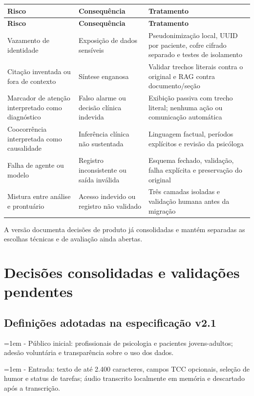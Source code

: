 \documentclass[11pt,a4paper]{article}
\begin{document}
\begingroup\small
\begin{longtable}{>{\raggedright\arraybackslash}p{}>{\raggedright\arraybackslash}p{}>{\raggedright\arraybackslash}p{}}
\toprule
\textbf{Risco} & \textbf{Consequência} & \textbf{Tratamento} \\ \midrule\endfirsthead
\toprule
\textbf{Risco} & \textbf{Consequência} & \textbf{Tratamento} \\ \midrule\endhead
\bottomrule\endfoot
Vazamento de identidade & Exposição de dados sensíveis & Pseudonimização local, UUID por paciente, cofre cifrado separado e testes de isolamento \\[3pt]
Citação inventada ou fora de contexto & Síntese enganosa & Validar trechos literais contra o original e RAG contra documento/seção \\[3pt]
Marcador de atenção interpretado como diagnóstico & Falso alarme ou decisão clínica indevida & Exibição passiva com trecho literal; nenhuma ação ou comunicação automática \\[3pt]
Coocorrência interpretada como causalidade & Inferência clínica não sustentada & Linguagem factual, períodos explícitos e revisão da psicóloga \\[3pt]
Falha de agente ou modelo & Registro inconsistente ou saída inválida & Esquema fechado, validação, falha explícita e preservação do original \\[3pt]
Mistura entre análise e prontuário & Acesso indevido ou registro não validado & Três camadas isoladas e validação humana antes da migração \\[3pt]
\end{longtable}
\endgroup
A versão documenta decisões de produto já consolidadas e mantém separadas as escolhas técnicas e de avaliação ainda abertas.

\section{Decisões consolidadas e validações pendentes}
\subsection{Definições adotadas na especificação v2.1}
\hangindent=1em - Público inicial: profissionais de psicologia e pacientes jovens-adultos; adesão voluntária e transparência sobre o uso dos dados.

\hangindent=1em - Entrada: texto de até 2.400 caracteres, campos TCC opcionais, seleção de humor e status de tarefas; áudio transcrito localmente em memória e descartado após a transcrição.
\end{document}

